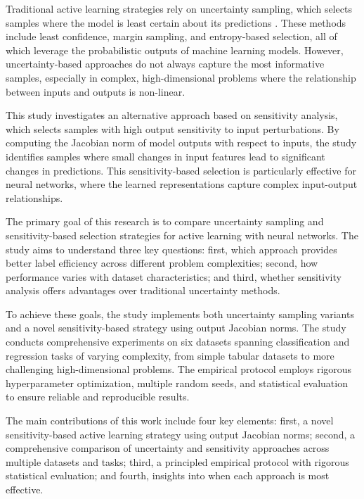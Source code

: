 \documentclass[conference]{IEEEtran}
\begin{document}
Traditional active learning strategies rely on uncertainty sampling, which selects samples where the model is least certain about its predictions \cite{settles2009active}. These methods include least confidence, margin sampling, and entropy-based selection, all of which leverage the probabilistic outputs of machine learning models. However, uncertainty-based approaches do not always capture the most informative samples, especially in complex, high-dimensional problems where the relationship between inputs and outputs is non-linear.

This study investigates an alternative approach based on sensitivity analysis, which selects samples with high output sensitivity to input perturbations. By computing the Jacobian norm of model outputs with respect to inputs, the study identifies samples where small changes in input features lead to significant changes in predictions. This sensitivity-based selection is particularly effective for neural networks, where the learned representations capture complex input-output relationships.

The primary goal of this research is to compare uncertainty sampling and sensitivity-based selection strategies for active learning with neural networks. The study aims to understand three key questions: first, which approach provides better label efficiency across different problem complexities; second, how performance varies with dataset characteristics; and third, whether sensitivity analysis offers advantages over traditional uncertainty methods.

To achieve these goals, the study implements both uncertainty sampling variants and a novel sensitivity-based strategy using output Jacobian norms. The study conducts comprehensive experiments on six datasets spanning classification and regression tasks of varying complexity, from simple tabular datasets to more challenging high-dimensional problems. The empirical protocol employs rigorous hyperparameter optimization, multiple random seeds, and statistical evaluation to ensure reliable and reproducible results.

The main contributions of this work include four key elements: first, a novel sensitivity-based active learning strategy using output Jacobian norms; second, a comprehensive comparison of uncertainty and sensitivity approaches across multiple datasets and tasks; third, a principled empirical protocol with rigorous statistical evaluation; and fourth, insights into when each approach is most effective.
\end{document}
